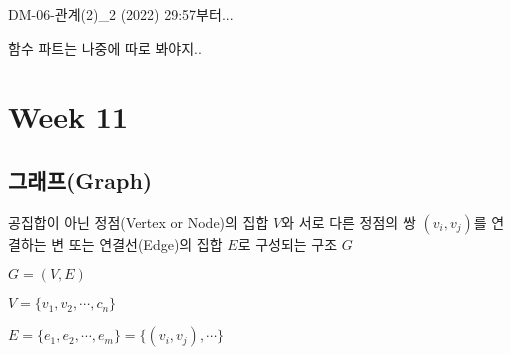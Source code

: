 DM-06-관계(2)_2 (2022) 29:57부터...

함수 파트는 나중에 따로 봐야지..

\newpage
\section{Week 11}
\subsection{그래프(Graph)}
공집합이 아닌 정점(Vertex or Node)의 집합 $V$와 서로 다른 정점의 쌍 $(v_i, v_j)$를 연결하는 변 또는 연결선(Edge)의 집합 $E$로 구성되는 구조 $G$

$G = (V, E)$

$V = \{v_1, v_2, \cdots, c_n\}$

$E = \{e_1, e_2, \cdots, e_m\} = \{(v_i, v_j), \cdots\}$\\

